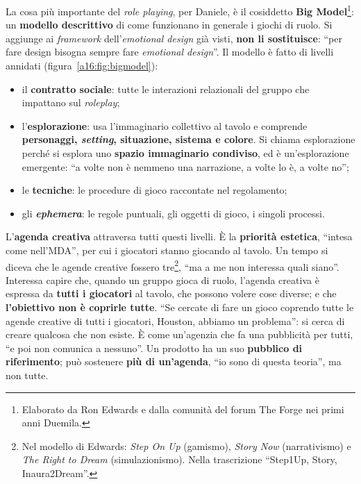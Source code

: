 La cosa più importante del \emph{role playing}, per Daniele, è il cosiddetto \textbf{Big
Model}\footnote{Elaborato da Ron Edwards e dalla comunità del forum The Forge nei primi anni
Duemila.}: un \textbf{modello descrittivo} di come funzionano in generale i giochi di ruolo. Si
aggiunge ai \emph{framework} dell'\emph{emotional design} già visti, \textbf{non li sostituisce}:
``per fare design bisogna sempre fare \emph{emotional design}''. Il modello è fatto di livelli
annidati (figura~\ref{a16:fig:bigmodel}):
\begin{itemize}
  \item il \textbf{contratto sociale}: tutte le interazioni relazionali del gruppo che impattano sul
        \emph{roleplay};
  \item l'\textbf{esplorazione}: usa l'immaginario collettivo al tavolo e comprende
        \textbf{personaggi, \emph{setting}, situazione, sistema e colore}. Si chiama esplorazione
        perché si esplora uno \textbf{spazio immaginario condiviso}, ed è un'esplorazione emergente:
        ``a volte non è nemmeno una narrazione, a volte lo è, a volte no'';
  \item le \textbf{tecniche}: le procedure di gioco raccontate nel regolamento;
  \item gli \textbf{\emph{ephemera}}: le regole puntuali, gli oggetti di gioco, i singoli processi.
\end{itemize}
L'\textbf{agenda creativa} attraversa tutti questi livelli. È la \textbf{priorità estetica}, ``intesa
come nell'MDA'', per cui i giocatori stanno giocando al tavolo. Un tempo si diceva che le agende
creative fossero tre\footnote{Nel modello di Edwards: \emph{Step On Up} (gamismo), \emph{Story Now}
(narrativismo) e \emph{The Right to Dream} (simulazionismo). Nella trascrizione ``Step1Up, Story,
Inaura2Dream''.}, ``ma a me non interessa quali siano''. Interessa capire che, quando un gruppo gioca
di ruolo, l'agenda creativa è espressa da \textbf{tutti i giocatori} al tavolo, che possono volere
cose diverse; e che \textbf{l'obiettivo non è coprirle tutte}. ``Se cercate di fare un gioco coprendo
tutte le agende creative di tutti i giocatori, Houston, abbiamo un problema'': si cerca di creare
qualcosa che non esiste. È come un'agenzia che fa una pubblicità per tutti, ``e poi non comunica a
nessuno''. Un prodotto ha un suo \textbf{pubblico di riferimento}; può sostenere \textbf{più di
un'agenda}, ``io sono di questa teoria'', ma non tutte.

